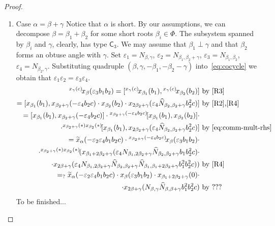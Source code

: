\documentclass{article}
\numberwithin{equation}{section}
\theoremstyle{definition}
\theoremstyle{remark}
\newcommand{\up}[2]{{^{#1}\!{#2}}}
\newcommand{\rC}{\mathsf{C}}
\begin{document}
\begin{proof}
\begin{enumerate}
 \item Case $\alpha = \beta + \gamma$ Notice that $\alpha$ is short. By our assumptions, we can decompose $\beta = \beta_1 + \beta_2$ for some short roots $\beta_i\in\Phi$.
 The subsystem spanned by $\beta_i$ and $\gamma$, clearly, has type $\rC_3$. We may assume that $\beta_1 \perp \gamma$ and that $\beta_2$ forms an obtuse angle with $\gamma$. Set $\varepsilon_1 = N_{\beta,\gamma}$, $\varepsilon_2 = N_{\beta_1, \beta_2 + \gamma}$, $\varepsilon_3 = N_{\beta_1, \beta_2}$, $\varepsilon_4 = N_{\beta_2, \gamma}$. Substituting quadruple $(\beta,\gamma,-\beta_1, -\beta_2-\gamma)$ into~\eqref{eq:cocycle} we obtain that $\varepsilon_1 \varepsilon_2 = \varepsilon_3 \varepsilon_4.$
 \begin{align*}
  \up{x_\gamma(c)}x_\beta(\varepsilon_3 b_1 b_2) = [\up{x_\gamma(c)} x_{\beta_1}(b_1), \up{x_\gamma(c)} x_{\beta_2}(b_2)] &\text{ by~\eqref{R3}}\\ 
  = [x_{\beta_1}(b_1), x_{\beta_2 + \gamma}(-\varepsilon_4b_2c) \cdot x_{\beta_2}(b_2) \cdot x_{2\beta_2 + \gamma}(\varepsilon_4\widehat{N}_{\beta_2, \beta_2+\gamma} b_2^2 c)]&\text{ by~\eqref{R2},\eqref{R4}}\\
  = [x_{\beta_1}(b_1), x_{\beta_2 + \gamma}(-\varepsilon_4b_2c)] \cdot \up{x_{\beta_2 + \gamma}(-\varepsilon_4b_2c)} [x_{\beta_1}(b_1), x_{\beta_2}(b_2)] \cdot \\ \cdot \up{x_{\beta_2 + \gamma}(*) x_{\beta_2}(*)}[x_{\beta_1}(b_1), x_{2\beta_2 + \gamma}(\varepsilon_4\widehat{N}_{\beta_2, \beta_2+\gamma} b_2^2 c)] & \text{ by~\eqref{eq:comm-mult-rhs}}\\
  = \widetilde{x}_{\alpha}(-\varepsilon_2 \varepsilon_4 b_1b_2c) \cdot \up{x_{\beta_2 + \gamma}(-\varepsilon_4b_2c)} x_{\beta}(\varepsilon_3b_1b_2) \cdot \\ \cdot \up{x_{\beta_2 + \gamma}(*) x_{\beta_2}(*)}(x_{\beta_1 + 2\beta_2+\gamma}(\varepsilon_4 N_{\beta_1, 2\beta_2 + \gamma} \widehat{N}_{\beta_2, \beta_2 + \gamma} b_1 b_2^2 c ) \cdot \\ \cdot x_{2\beta+\gamma}(\varepsilon_4 N_{\beta_1, 2\beta_2 + \gamma} \widehat{N}_{\beta_2, \beta_2 + \gamma} \widehat{N}_{\beta_1, \beta_1 + 2\beta_2 + \gamma} b_1^2 b_2^2 c )) &\text{ by~\eqref{R4}}\\
  =_? \widetilde{x}_{\alpha}(-\varepsilon_2\varepsilon_4 b_1b_2c) \cdot x_{\beta}(\varepsilon_3 b_1 b_2) \cdot x_{\beta_1 + 2\beta_2+\gamma}(0) \cdot \\ \cdot x_{2\beta+\gamma}(N_{\beta, \gamma} \widehat{N}_{\beta, \beta+\gamma} b_1^2 b_2^2 c ) &\text{ by ???}
 \end{align*}
To be finished...
 

\end{enumerate}
\end{proof}
\end{document}
